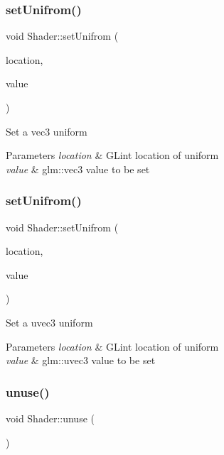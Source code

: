 \subsubsection{\texorpdfstring{setUnifrom()}{setUnifrom()}\hspace{0.1cm}{\footnotesize\ttfamily [1/2]}}
{\footnotesize\ttfamily void Shader\+::set\+Unifrom (\begin{DoxyParamCaption}\item[{G\+Lint}]{location,  }\item[{const glm\+::vec3 \&}]{value }\end{DoxyParamCaption})}

Set a vec3 uniform


\begin{DoxyParams}{Parameters}
{\em location} & G\+Lint location of uniform \\
\hline
{\em value} & glm\+::vec3 value to be set \\
\hline
\end{DoxyParams}
\mbox{\label{class_shader_a817f7990832a2d6694ce401c13ec849b}} 
\subsubsection{\texorpdfstring{setUnifrom()}{setUnifrom()}\hspace{0.1cm}{\footnotesize\ttfamily [2/2]}}
{\footnotesize\ttfamily void Shader\+::set\+Unifrom (\begin{DoxyParamCaption}\item[{G\+Lint}]{location,  }\item[{const glm\+::uvec3 \&}]{value }\end{DoxyParamCaption})}

Set a uvec3 uniform


\begin{DoxyParams}{Parameters}
{\em location} & G\+Lint location of uniform \\
\hline
{\em value} & glm\+::uvec3 value to be set \\
\hline
\end{DoxyParams}
\mbox{\label{class_shader_a8eb0c22bd8a71aaf85f4ce7a4102fa34}} 
\subsubsection{\texorpdfstring{unuse()}{unuse()}}
{\footnotesize\ttfamily void Shader\+::unuse (\begin{DoxyParamCaption}{ }\end{DoxyParamCaption})}

